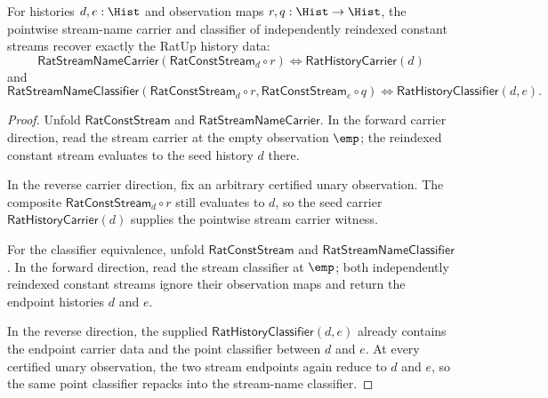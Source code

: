 \begin{theorem}
\label{thm:rat-stream-name-independent-reindexed-constant-point-exactness}
For histories $d,e:\Hist$ and observation maps $r,q:\Hist\to\Hist$, the
pointwise stream-name carrier and classifier of independently reindexed
constant streams recover exactly the RatUp history data:
$$
\mathsf{RatStreamNameCarrier}(\mathsf{RatConstStream}_d\circ r)
\Longleftrightarrow
\mathsf{RatHistoryCarrier}(d)
$$
and
$$
\mathsf{RatStreamNameClassifier}(\mathsf{RatConstStream}_d\circ r,
\mathsf{RatConstStream}_e\circ q)
\Longleftrightarrow
\mathsf{RatHistoryClassifier}(d,e).
$$
\end{theorem}
\begin{proof}
Unfold $\mathsf{RatConstStream}$ and $\mathsf{RatStreamNameCarrier}$. In the
forward carrier direction, read the stream carrier at the empty observation
$\emp$; the reindexed constant stream evaluates to the seed history $d$ there.

In the reverse carrier direction, fix an arbitrary certified unary observation.
The composite $\mathsf{RatConstStream}_d\circ r$ still evaluates to $d$, so the
seed carrier $\mathsf{RatHistoryCarrier}(d)$ supplies the pointwise stream
carrier witness.

For the classifier equivalence, unfold $\mathsf{RatConstStream}$ and
$\mathsf{RatStreamNameClassifier}$. In the forward direction, read the stream
classifier at $\emp$; both independently reindexed constant streams ignore their
observation maps and return the endpoint histories $d$ and $e$.

In the reverse direction, the supplied
$\mathsf{RatHistoryClassifier}(d,e)$ already contains the endpoint carrier data
and the point classifier between $d$ and $e$. At every certified unary
observation, the two stream endpoints again reduce to $d$ and $e$, so the same
point classifier repacks into the stream-name classifier.
\end{proof}

